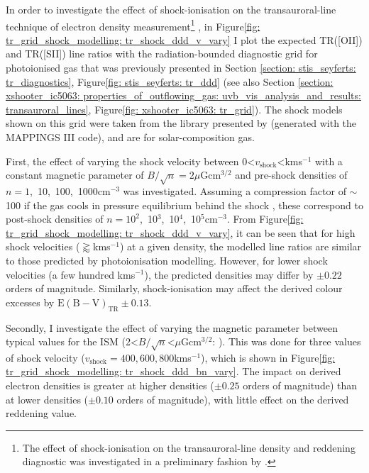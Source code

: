 In order to investigate the effect of shock-ionisation on the transauroral-line technique of electron density measurement\footnote{The effect of shock-ionisation on the transauroral-line density and reddening diagnostic was investigated in a preliminary fashion by \citet{SpenceThesis}.} \citep{Holt2011}, in Figure\;\ref{fig: tr_grid_shock_modelling: tr_shock_ddd_v_vary} I plot the expected TR([OII]) and TR([SII]) line ratios with the radiation-bounded diagnostic grid for photoionised gas that was previously presented in Section \ref{section: stis_seyferts: tr_diagnostics}, Figure\;\ref{fig: stis_seyferts: tr_ddd} (see also Section \ref{section: xshooter_ic5063: properties_of_outflowing_gas: uvb_vis_analysis_and_results: transauroral_lines}, Figure\;\ref{fig: xshooter_ic5063: tr_grid}). The shock models shown on this grid were taken from the library presented by \citet{Allen2008} (generated with the \textsc{MAPPINGS III} code), and are for solar-composition gas.

First, the effect of varying the shock velocity between 0\;\textless\;$v_\mathrm{shock}$\;\textless{}\;km\;s$^{-1}$ with a constant magnetic parameter of $B/\sqrt{n}=2$\;$\mu$G\;cm$^{3/2}$ and pre-shock densities of \mbox{$n=1$, 10, 100, 1000\;cm$^{-3}$} was investigated. Assuming a compression factor of $\sim$100 if the gas cools in pressure equilibrium behind the shock \citep{Sutherland2017, Santoro2018}, these correspond to post-shock densities of \mbox{$n=10^2$, 10$^3$, 10$^4$, 10$^5$\;cm$^{-3}$}. From Figure\;\ref{fig: tr_grid_shock_modelling: tr_shock_ddd_v_vary}, it can be seen that for high shock velocities ($\gtrapprox$\;km\;s$^{-1}$) at a given density, the modelled line ratios are similar to those predicted by photoionisation modelling. However, for lower shock velocities (a few hundred km\;s$^{-1}$), the predicted densities may differ by $\pm0.22$ orders of magnitude. Similarly, shock-ionisation may affect the derived colour excesses by $\mathrm{E(B-V)}_\mathrm{TR}\pm0.13$.

Secondly, I investigate the effect of varying the magnetic parameter between typical values for the ISM (2\;\textless\;$B/\sqrt{n}$\;\textless{}\;$\mu$G\;cm$^{3/2}$: \citealt{Dopita1995, Allen2008}). This was done for three values of shock velocity \mbox{($v_\mathrm{shock}=400, 600, 800$\;km\;s$^{-1}$)}, which is shown in Figure\;\ref{fig: tr_grid_shock_modelling: tr_shock_ddd_bn_vary}. The impact on derived electron densities is greater at higher densities ($\pm0.25$ orders of magnitude) than at lower densities ($\pm0.10$ orders of magnitude), with little effect on the derived reddening value.

